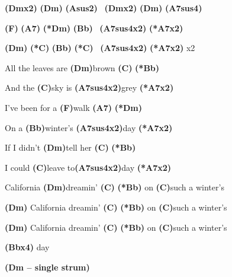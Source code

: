 \documentclass{article}
\newenvironment{song}{%
	\pagebreak%
	\parindent0pt%
    \Large%
}{%
}%
\newcommand{\ch}[1]{\textbf{(#1)}}
\newcommand{\rep}[1]{\hspace{2pt}x#1}
\begin{document}
\begin{song}
\bigskip

\ch{Dm\rep2} \ch{Dm} \ch{Asus2} \textbar\ \ch{Dm\rep2} \ch{Dm} \ch{A7sus4} \par
\ch{F} \ch{A7} \ch{*Dm} \ch{Bb} \textbar\ \ch{A7sus4\rep2} \ch{*A7\rep2} \par
\ch{Dm} \ch{*C} \ch{Bb} \ch{*C} \textbar\ \ch{A7sus4\rep2} \ch{*A7\rep2} x2 \par

\bigskip

All the leaves are \ch{Dm}brown \ch{C} \ch{*Bb} \par
And the \ch{C}sky is \ch{A7sus4\rep2}grey \ch{*A7\rep2} \par
I've been for a \ch{F}walk \ch{A7} \ch{*Dm} \par
On a \ch{Bb}winter's \ch{A7sus4\rep2}day \ch{*A7\rep2} \par
If I didn’t \ch{Dm}tell her \ch{C} \ch{*Bb} \par
I could \ch{C}leave to\ch{A7sus4\rep2}day \ch{*A7\rep2} \par

\bigskip

California \ch{Dm}dreamin’ \ch{C} \ch{*Bb} on \ch{C}such a winter's \par
\ch{Dm} California dreamin’ \ch{C} \ch{*Bb} on \ch{C}such a winter's \par
\ch{Dm} California dreamin’ \ch{C} \ch{*Bb} on \ch{C}such a winter's \par
\ch{Bb\rep4} day \par
\ch{Dm – single strum} \par

\end{song}
\end{document}
